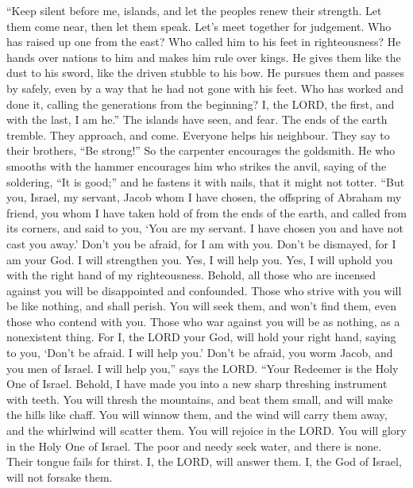  ``Keep silent before me, islands, and let the peoples renew
their strength. Let them come near, then let them speak. Let's meet
together for judgement.  Who has raised up one from the
east? Who called him to his feet in righteousness? He hands over nations
to him and makes him rule over kings. He gives them like the dust to his
sword, like the driven stubble to his bow.  He pursues them
and passes by safely, even by a way that he had not gone with his feet.
 Who has worked and done it, calling the generations from
the beginning? I, the LORD, the first, and with the last, I am he.''
 The islands have seen, and fear. The ends of the earth
tremble. They approach, and come.  Everyone helps his
neighbour. They say to their brothers, ``Be strong!''  So
the carpenter encourages the goldsmith. He who smooths with the hammer
encourages him who strikes the anvil, saying of the soldering, ``It is
good;'' and he fastens it with nails, that it might not totter.
 ``But you, Israel, my servant, Jacob whom I have chosen,
the offspring of Abraham my friend,  you whom I have taken
hold of from the ends of the earth, and called from its corners, and
said to you, `You are my servant. I have chosen you and have not cast
you away.'  Don't you be afraid, for I am with you. Don't
be dismayed, for I am your God. I will strengthen you. Yes, I will help
you. Yes, I will uphold you with the right hand of my righteousness.
 Behold, all those who are incensed against you will be
disappointed and confounded. Those who strive with you will be like
nothing, and shall perish.  You will seek them, and won't
find them, even those who contend with you. Those who war against you
will be as nothing, as a nonexistent thing.  For I, the
LORD your God, will hold your right hand, saying to you, `Don't be
afraid. I will help you.'  Don't be afraid, you worm Jacob,
and you men of Israel. I will help you,'' says the LORD. ``Your Redeemer
is the Holy One of Israel.  Behold, I have made you into a
new sharp threshing instrument with teeth. You will thresh the
mountains, and beat them small, and will make the hills like chaff.
 You will winnow them, and the wind will carry them away,
and the whirlwind will scatter them. You will rejoice in the LORD. You
will glory in the Holy One of Israel.  The poor and needy
seek water, and there is none. Their tongue fails for thirst. I, the
LORD, will answer them. I, the God of Israel, will not forsake them.

